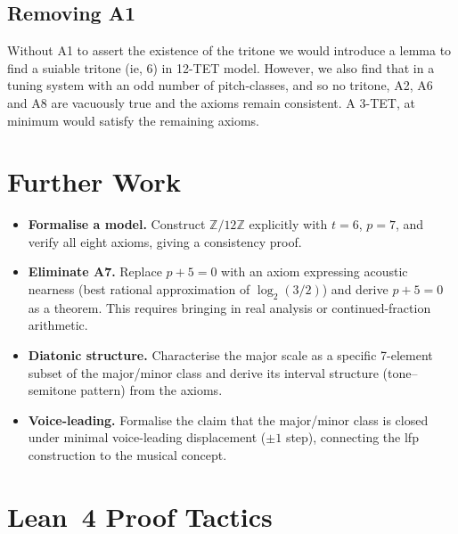 \documentclass{amsart}
\begin{document}
\subsection{Removing A1}
Without A1 to assert the existence of the tritone we would introduce a lemma to find
a suiable tritone (ie, $6$) in 12-TET model. However, we also find that in a tuning system
with an odd number of pitch-classes, and so no tritone, A2, A6 and A8 are vacuously true
and the axioms remain consistent. A 3-TET, at minimum would satisfy the remaining axioms.

\section{Further Work}
\label{sec:further}

\begin{itemize}
  \item \textbf{Formalise a model.}  Construct $\mathbb{Z}/12\mathbb{Z}$
    explicitly with $t = 6$, $p = 7$, and verify all eight axioms, giving
    a consistency proof.

  \item \textbf{Eliminate A7.}  Replace $p + 5 = 0$ with an axiom
    expressing acoustic nearness (best rational approximation of
    $\log_2(3/2)$) and derive $p + 5 = 0$ as a theorem.  This requires
    bringing in real analysis or continued-fraction arithmetic.

  \item \textbf{Diatonic structure.}  Characterise the major scale as a
    specific 7-element subset of the major/minor class and derive its
    interval structure (tone--semitone pattern) from the axioms.

  \item \textbf{Voice-leading.}  Formalise the claim that the major/minor
    class is closed under minimal voice-leading displacement ($\pm 1$ step),
    connecting the lfp construction to the musical concept.
\end{itemize}

\appendix
\section{Lean~4 Proof Tactics}
\label{app:tactics}
\end{document}
